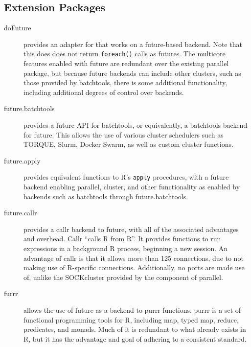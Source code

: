 \hypertarget{sec:extension-packages}{%
    \subsection{Extension Packages}\label{sec:extension-packages}}

\begin{description}
    \item[doFuture]
        \cite{bengtsson20do} provides an adapter for \cite{microsoft20}
        that works on a future-based backend. Note that this does does not
        return \texttt{foreach()} calls as futures. The multicore features enabled with
        future are redundant over the existing parallel package, but because
        future backends can include other clusters, such as those provided by
        batchtools, there is some additional functionality, including additional
        degrees of control over backends.
    \item[future.batchtools]
        \cite{bengtsson19batch} provides a future API for
        batchtools\cite{lang17}, or equivalently, a batchtools backend for
        future. This allows the use of various cluster schedulers such as
        TORQUE, Slurm, Docker Swarm, as well as custom cluster functions.
    \item[future.apply]
        \cite{bengtsson20apply} provides equivalent functions to R's
        \texttt{apply} procedures, with a future backend enabling parallel,
        cluster, and other functionality as enabled by backends such as
        batchtools through future.batchtools.
    \item[future.callr]
        \cite{bengtsson19callr} provides a callr\cite{csardi20} backend to
        future, with all of the associated advantages and overhead. Callr
        ``calls R from R''. It provides functions to run expressions in a
        background R process, beginning a new session. An advantage of callr is
        that it allows more than 125 connections, due to not making use of
        R-specific connections. Additionally, no ports are made use of, unlike
        the SOCKcluster provided by the  component of parallel.
    \item[furrr]
        \cite{vaughan18} allows the use of future as a backend to purrr
        functions. purrr is a set of functional programming tools for R,
        including map, typed map, reduce, predicates, and monads. Much of it is
        redundant to what already exists in R, but it has the advantage and goal
        of adhering to a consistent standard.
\end{description}

